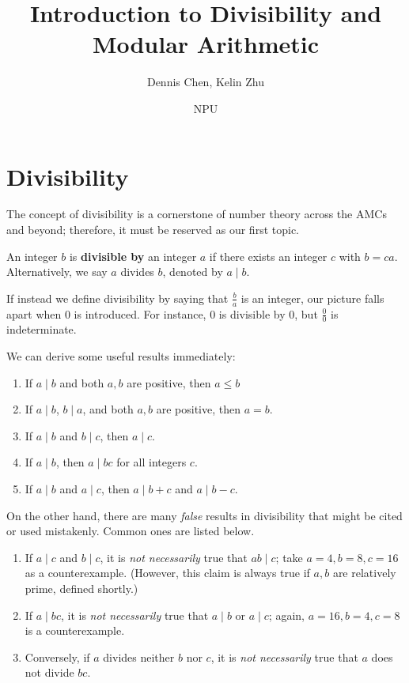 \documentclass[mast]{lucky}
\title{Introduction to Divisibility and Modular Arithmetic}
\author{Dennis Chen, Kelin Zhu}
\date{NPU}
\begin{document}
\maketitle

\section{Divisibility}
The concept of divisibility is a cornerstone of number theory across the AMCs and beyond; therefore, it must be reserved as our first topic.

\begin{defi}[Divisibility]
An integer $b$ is \textbf{divisible by} an integer $a$ if there exists an integer $c$ with $b=ca$. Alternatively, we say $a$ divides $b$, denoted by $a \mid b$.
\end{defi}

\begin{remark}
If instead we define divisibility by saying that $\frac{b}{a}$ is an integer, our picture falls apart when $0$ is introduced. For instance, $0$ is divisible by $0$, but $\frac{0}{0}$ is indeterminate.
\end{remark}

We can derive some useful results immediately:

\begin{fact}
\hfill
\begin{enumerate}
    \item If $a\mid b$ and both $a,b$ are positive, then $a\le b$
    \item If $a\mid b$, $b\mid a$, and both $a,b$ are positive, then $a=b$.
    \item If $a\mid b$ and $b\mid c$, then $a\mid c.$
    \item If $a\mid b$, then $a\mid bc$ for all integers $c.$
    \item If $a\mid b$ and $a\mid c$, then $a\mid b+c$ and $a\mid b-c$.
\end{enumerate}
\end{fact}

On the other hand, there are many \emph{false} results in divisibility that might be cited or used mistakenly. Common ones are listed below.
\begin{enumerate}
\item If $a\mid c$ and $b\mid c$, it is \emph{not necessarily} true that $ab\mid c$; take $a=4,b=8,c=16$ as a counterexample. (However, this claim is always true if $a,b$ are relatively prime, defined shortly.)
\item If $a\mid bc$, it is \emph{not necessarily} true that $a\mid b$ or $a\mid c$; again, $a=16, b=4, c=8$ is a counterexample.
\item Conversely, if $a$ divides neither $b$ nor $c$, it is \emph{not necessarily} true that $a$ does not divide $bc$.
\end{enumerate}
\end{document}

